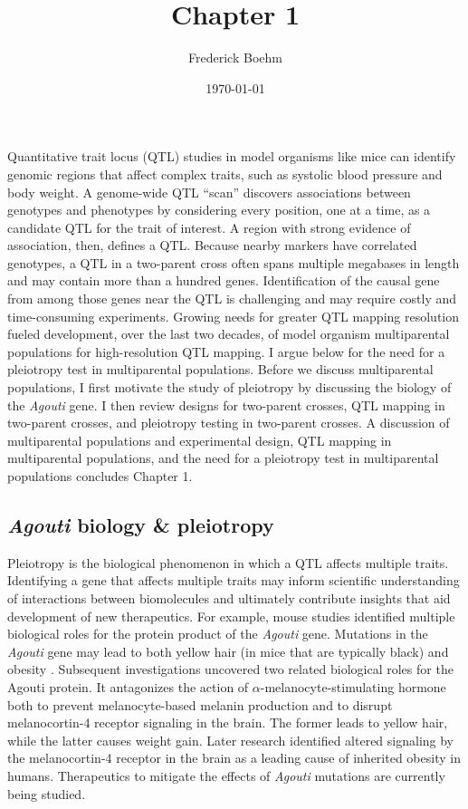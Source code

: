 \documentclass[]{article}\usepackage[]{graphicx}\usepackage[]{color}
\title{Chapter 1}
\author{Frederick Boehm}
\date{\today}
\begin{document}
\doublespacing
\maketitle

\listoftodos
\listoffigures
\listoftables



Quantitative trait locus (QTL) studies in model organisms like mice can identify 
genomic regions that affect complex traits, such as systolic blood pressure and body weight.
A genome-wide QTL ``scan'' discovers
associations between genotypes and phenotypes by considering every position, one at a time, as a candidate QTL for the trait of interest.
A region with strong evidence of association, then, defines a QTL. Because nearby markers have correlated
genotypes, a QTL in a two-parent cross often spans multiple megabases in length and may contain more than a hundred genes.
Identification of the causal gene from among those genes near the QTL is challenging and may require costly and time-consuming experiments. 
Growing needs for greater QTL mapping resolution fueled development, over the
last two decades, of model organism multiparental populations for high-resolution QTL mapping.
I argue below for the need for a pleiotropy test in multiparental populations. 
Before we discuss multiparental populations, I first motivate the study of
pleiotropy by discussing the biology of the \emph{Agouti} gene. I then review designs for two-parent crosses, QTL mapping in
two-parent crosses, and pleiotropy testing in two-parent crosses.
A discussion of multiparental populations and experimental design, QTL mapping
in multiparental populations, and the need for a pleiotropy test in
multiparental populations concludes Chapter 1.




\subsection{\emph{Agouti} biology \& pleiotropy}
Pleiotropy is the biological phenomenon in which a QTL affects multiple traits. 
Identifying a gene that affects multiple traits may inform scientific understanding of
interactions between biomolecules and ultimately contribute insights that aid development
of new therapeutics. 
For example, mouse studies identified multiple biological roles for the protein product of 
the \emph{Agouti} gene. Mutations in the \emph{Agouti} gene may lead to both 
yellow hair (in mice that are typically black) and obesity \citep{attie2017how}.
Subsequent investigations uncovered two related biological roles for the Agouti protein.
It antagonizes the action of $\alpha$-melanocyte-stimulating hormone both to
prevent melanocyte-based melanin production and to disrupt melanocortin-4
receptor signaling in the brain.
The former leads to yellow hair, while the latter causes weight gain.
Later research identified altered signaling by the melanocortin-4 receptor in
the brain as a leading cause of inherited obesity in humans.
Therapeutics to mitigate the effects of \emph{Agouti} mutations are currently being studied.
\end{document}
